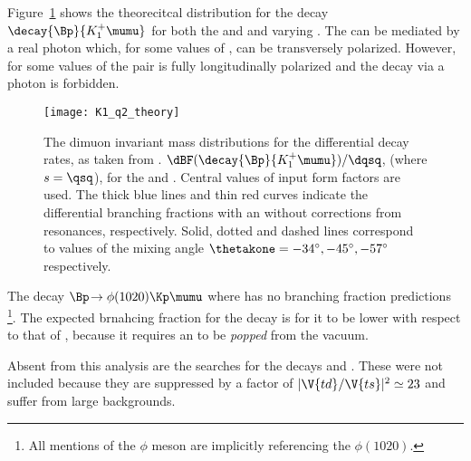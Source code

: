 Figure~\ref{fig:th:thetak1} shows the theorecitcal \qsq distribution for the decay
$\decay{\Bp}{K_1^+\mumu}$ for both the  and  and varying \thetakone.
The  can be mediated by a real photon which, for some values of \thetakone, can be
transversely polarized.
However, for some values of \thetakone the \mumu pair is fully longitudinally polarized and the
decay via a photon is forbidden.

\begin{figure}
  \begin{center}
    \texttt{[image: K1\_q2\_theory]}
    \caption[Theoretical \qsq distribution for $\decay{\Bp}{K_1^+\mumu}$]
    {\small
      The dimuon invariant mass distributions for the differential decay rates, as taken from
      .
      $\dBF(\decay{\Bp}{K_1^+\mumu})/\dqsq$, (where $s=\qsq$), for the  and .
      Central values of input form factors are used.
      The thick blue lines and thin red curves indicate the differential branching fractions with
      an without corrections from resonances, respectively.
      Solid, dotted and dashed lines correspond to values of the mixing angle
      $\thetakone=-34^\circ,-45^\circ,-57^\circ$ respectively.
    }
    \label{fig:th:thetak1}
  \end{center}
\end{figure}

The decay $\Bp\!\to\phi(1020)\Kp\mumu$ where \decay{\phi}{\kk} has no branching fraction
predictions
\footnote{All mentions of the $\phi$ meson are implicitly
  referencing the $\phi(1020)$.
}.
The expected brnahcing fraction for the decay \btophikmumu is for it to be lower with respect to
that of \btokpipimumu, because it requires an \ssbar to be \emph{popped} from the vacuum.

Absent from this analysis are the searches for the decays \decay{\Bp}{\Kp\Km\pip\mumu}
and \decay{\Bp}{\pipi\pim\mumu}.
These were not included because they are suppressed by a factor of $|\V{td}/\V{ts}|^2\simeq23$ and
suffer from large backgrounds.








